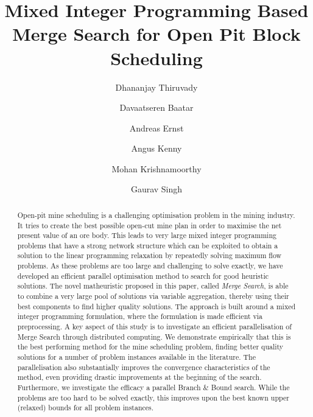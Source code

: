 \documentclass[authoryear,11pt,square,number,times,super,comma]{elsarticle}
\title{Mixed Integer Programming Based Merge Search for Open Pit Block Scheduling}
\author[deakin]{Dhananjay Thiruvady}
\author[monash]{Davaatseren Baatar}
\author[monash]{Andreas Ernst}
\author[rmit]{Angus Kenny} %
\author[uq]{Mohan Krishnamoorthy} %
\author[bhp]{Gaurav Singh}
\begin{document}
\begin{frontmatter}
\begin{abstract}
Open-pit mine scheduling is a challenging optimisation problem in the mining industry. It tries to create the best possible open-cut mine plan in order to maximise the 
net present value of an ore body. This leads to very large mixed integer programming problems that have a strong network structure which can be exploited to obtain a solution to the linear programming relaxation by repeatedly solving maximum flow problems. As these problems are too large and challenging to solve exactly, we have developed an efficient parallel  optimisation method to search for good heuristic solutions. The novel matheuristic proposed in this paper, called {\it Merge Search},  is able to combine a very large pool of solutions via variable aggregation, thereby using their best components to find higher quality solutions. The approach is built around a mixed integer programming formulation, where the formulation is made efficient via preprocessing. A key aspect of this study is to investigate an efficient parallelisation of Merge Search through distributed computing. We demonstrate empirically that this is the best performing method for the mine scheduling problem, finding better quality solutions for a number of problem instances available in the literature. The parallelisation also substantially improves the convergence characteristics of the method, even providing drastic improvements at the beginning of the search. Furthermore, we investigate the efficacy a parallel Branch \& Bound search. While the problems are too hard to be solved exactly, this improves upon the best known upper (relaxed) bounds for all problem instances. 
\end{abstract}
\end{frontmatter}
\end{document}
